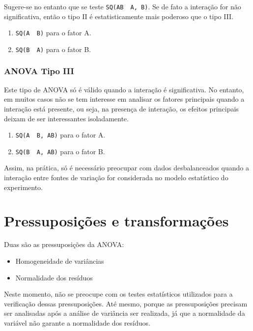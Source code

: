 \documentclass[
]{article}
\providecommand{\tightlist}{%
  \setlength{\itemsep}{0pt}\setlength{\parskip}{0pt}}
\begin{document}
Sugere-se no entanto que se teste \texttt{SQ(AB\ \textbar{}\ A,\ B)}. Se de fato a interação for não significativa, então o tipo II é estatisticamente mais poderoso que o tipo III.

\begin{enumerate}
\def\labelenumi{\arabic{enumi}.}
\tightlist
\item
  \texttt{SQ(A\ \textbar{}\ B)} para o fator A.
\item
  \texttt{SQ(B\ \textbar{}\ A)} para o fator B.
\end{enumerate}

\hypertarget{anova-tipo-iii}{%
\subsubsection{ANOVA Tipo III}\label{anova-tipo-iii}}

Este tipo de ANOVA só é válido quando a interação é significativa. No entanto, em muitos casos não se tem interesse em analisar os fatores principais quando a interação está presente, ou seja, na presença de interação, os efeitos principais deixam de ser interessantes isoladamente.

\begin{enumerate}
\def\labelenumi{\arabic{enumi}.}
\tightlist
\item
  \texttt{SQ(A\ \textbar{}\ B,\ AB)} para o fator A.
\item
  \texttt{SQ(B\ \textbar{}\ A,\ AB)} para o fator B.
\end{enumerate}

Assim, na prática, só é necessário preocupar com dados desbalanceados quando a interação entre fontes de variação for considerada no modelo estatístico do experimento.

\hypertarget{pressuposiuxe7uxf5es-e-transformauxe7uxf5es}{%
\section{Pressuposições e transformações}\label{pressuposiuxe7uxf5es-e-transformauxe7uxf5es}}

Duas são as pressuposições da ANOVA:

\begin{itemize}
\tightlist
\item
  Homogeneidade de variâncias
\item
  Normalidade dos resíduos
\end{itemize}

Neste momento, não se preocupe com os testes estatísticos utilizados para a verificação dessas pressuposições. Até mesmo, porque as pressuposições precisam ser analisadas após a análise de variância ser realizada, já que a normalidade da variável não garante a normalidade dos resíduos.
\end{document}
